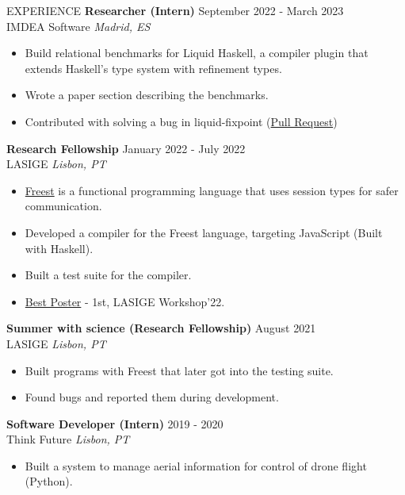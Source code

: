 \documentclass{resume} %
\begin{document}
\begin{rSection}{EXPERIENCE}
  \textbf{Researcher (Intern)} \hfill September 2022 - March 2023\\
  IMDEA Software \hfill \textit{Madrid, ES}
  \begin{itemize}
    \itemsep -3pt {}
  \item Build relational benchmarks for Liquid Haskell, a compiler plugin that extends Haskell’s type system with refinement types.
  \item Wrote a paper section describing the benchmarks.
  \item Contributed with solving a bug in liquid-fixpoint (\href{https://github.com/ucsd-progsys/liquid-fixpoint/pull/626}{Pull Request})
  \end{itemize}
  
  \textbf{Research Fellowship} \hfill January 2022 - July 2022\\
  LASIGE \hfill \textit{Lisbon, PT}
  \begin{itemize}
    \itemsep -3pt {}
  \item \href{https://freest-lang.github.io/}{Freest} is a functional programming language
    that uses session types for safer communication.
  \item Developed a compiler for the Freest language, targeting JavaScript (Built with Haskell).
  \item Built a test suite for the compiler.
  \item \href{https://alf0nso.github.io/docs/FreeSTwebCompiler.pdf}{Best Poster} - 1st, LASIGE Workshop'22.
  \end{itemize}

  \textbf{Summer with science (Research Fellowship)} \hfill August 2021 \\
  LASIGE \hfill \textit{Lisbon, PT}
  \begin{itemize}
    \itemsep -3pt {} 
  \item Built programs with Freest that later got into the testing suite.
  \item Found bugs and reported them during development.
  \end{itemize}

  \textbf{Software Developer (Intern)} \hfill 2019 - 2020 \\
  Think Future \hfill \textit{Lisbon, PT}
  \begin{itemize}
    \itemsep -3pt {} 
  \item Built a system to manage aerial information for control of drone flight (Python).
  \end{itemize}


\end{rSection}
\end{document}
